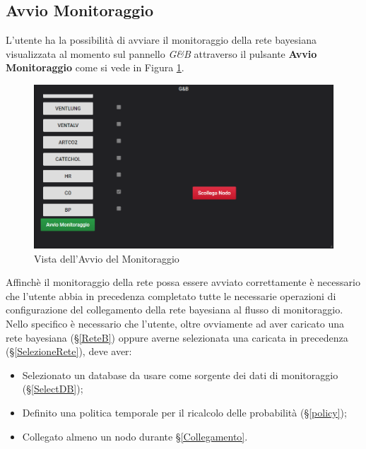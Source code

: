 \subsection{Avvio Monitoraggio}\label{Avvio}

L'utente ha la possibilità di avviare il monitoraggio della rete bayesiana visualizzata al momento sul pannello \textit{G\&B} attraverso il pulsante \textbf{Avvio Monitoraggio} come si vede in Figura \ref{AvvioMonitoraggio}.

\begin{figure}[H]
	\begin{center}
		\includegraphics[scale=0.7]{./images/AvvioMonitoraggio.png}
		 \caption{Vista dell'Avvio del Monitoraggio}	
		 \label{AvvioMonitoraggio}
	\end{center}
\end{figure}

Affinchè il monitoraggio della rete possa essere avviato correttamente è necessario che l'utente abbia in precedenza completato tutte le necessarie operazioni di configurazione del collegamento della rete bayesiana al flusso di monitoraggio.\\
Nello specifico è necessario che l'utente, oltre ovviamente ad aver caricato una rete bayesiana (§\ref{ReteB}) oppure averne selezionata una caricata in precedenza (§\ref{SelezioneRete}), deve aver:
\begin{itemize}
	\item Selezionato un database da usare come sorgente dei dati di monitoraggio (§\ref{SelectDB});
	\item Definito una politica temporale per il ricalcolo delle probabilità (§\ref{policy});
	\item Collegato almeno un nodo durante §\ref{Collegamento}.
\end{itemize} 

